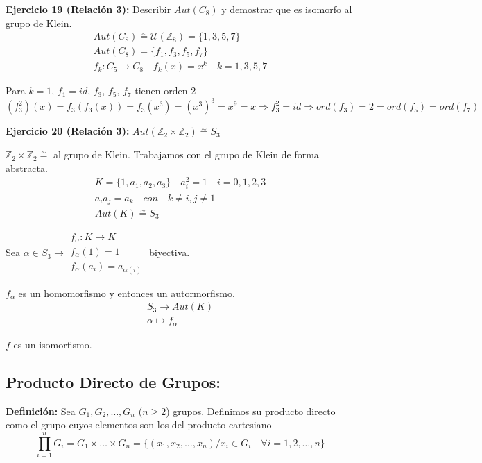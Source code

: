 \documentclass{article}
\begin{document}
\textbf{Ejercicio 19 (Relación 3):} Describir $Aut(C_8)$ y demostrar que es isomorfo al grupo de Klein.
\begin{gather*}
Aut(C_8)\overset{\sim}{=}\mathcal{U}(\mathbb{Z}_8)=\{1,3,5,7\}\\
Aut(C_8)=\{f_1,f_3,f_5,f_7\} \\
f_k:C_5\longrightarrow C_8 \quad f_k(x)=x^k \quad k=1,3,5,7
\end{gather*}

Para $k=1$, $f_1=id$, $f_3,\,f_5,\,f_7$ tienen orden 2
\begin{equation*}
(f_3^2)(x)=f_3(f_3(x))=f_3(x^3)=(x^3)^3=x^9=x\Rightarrow f_3^2=id\Rightarrow ord(f_3)=2=ord(f_5)=ord(f_7)
\end{equation*}

\textbf{Ejercicio 20 (Relación 3):} $Aut(\mathbb{Z}_2\times \mathbb{Z}_2)\overset{\sim}{=} S_3$

$\mathbb{Z}_2\times \mathbb{Z}_2\overset{\sim}{=}$ al grupo de Klein. Trabajamos con el grupo de Klein de forma abstracta.
\begin{gather*}
K=\{1,a_1,a_2,a_3\}\quad a_i^2=1\quad i=0,1,2,3 \\
a_ia_j=a_k\quad con\quad k\neq i,j\neq 1\\
Aut(K)\overset{\sim}{=} S_3
\end{gather*}

Sea $\alpha \in S_3 \longrightarrow \left. \begin{array}{c}f_\alpha:K\longrightarrow K \\
f_\alpha(1)=1\\
f_\alpha(a_i)=a_{\alpha(i)}
\end{array} \right.$ biyectiva. 

$f_\alpha$ es un homomorfismo y entonces un autormorfismo.
\begin{gather*}
S_3\rightarrow Aut(K)\\
\alpha \longmapsto f_\alpha
\end{gather*}

$f$ es un isomorfismo. 

\subsection{Producto Directo de Grupos:}
\textbf{Definición:} Sea $G_1,G_2,\ldots,G_n$ ($n\geq 2$) grupos. Definimos su producto directo como el grupo cuyos elementos son los del producto cartesiano
\begin{equation*}
\prod_{i=1}^n G_i=G_1\times \ldots \times G_n=\{(x_1,x_2,\ldots,x_n)/x_i\in G_i\quad \forall i=1,2,\ldots,n\}
\end{equation*}
\end{document}
